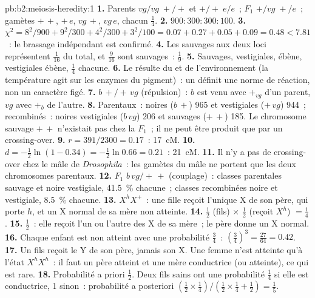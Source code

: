 \begin{solution}{pb:b2:meiosis-heredity:1}
\textbf{1.} Parents $vg/vg\;+/+$ et $+/+\;e/e$~; $F_1$ $+/vg\;+/e$~;
gamètes $+\,+$, $+\,e$, $vg\,+$, $vg\,e$, chacun $\tfrac14$.
\textbf{2.} $900 : 300 : 300 : 100$.
\textbf{3.} $\chi^2 = 8^2/900 + 9^2/300 + 4^2/300 + 3^2/100 = 0.07 +
0.27 + 0.05 + 0.09 = 0.48 < 7.81$~: le brassage indépendant est
confirmé.
\textbf{4.} Les  sauvages aux deux loci représentent
$\tfrac{1}{16}$ du total, et $\tfrac{9}{16}$ sont sauvages~: $\tfrac19$.
\textbf{5.} Sauvages, vestigiales, ébène, vestigiales ébène, $\tfrac14$
chacune.
\textbf{6.} Le  résulte du  et de l'environnement (la
température agit sur les enzymes du pigment)~: un  définit une
norme de réaction, non un caractère figé.
\textbf{7.} $b\,+/+\,vg$ (répulsion)~: $b$ est venu avec $+_{vg}$ d'un
parent, $vg$ avec $+_b$ de l'autre.
\textbf{8.} Parentaux~: noires ($b\,+$) 965 et vestigiales ($+\,vg$)
944~; recombinés~: noires vestigiales ($b\,vg$) 206 et sauvages
($+\,+$) 185. Le chromosome sauvage $+\,+$ n'existait pas chez la
$F_1$~; il ne peut être produit que par un crossing-over.
\textbf{9.} $r = 391/2300 = 0.17$~: \qty{17}{cM}.
\textbf{10.} $d = -\tfrac12\ln(1 - 0.34) = -\tfrac12\ln 0.66 = 0.21$~:
\qty{21}{cM}.
\textbf{11.} Il n'y a pas de crossing-over chez le mâle de
\emph{Drosophila}~: les gamètes du mâle ne portent que les deux
chromosomes parentaux.
\textbf{12.} $F_1$ $b\,vg/+\,+$ (couplage)~: classes parentales sauvage
et noire vestigiale, \qty{41.5}{\%} chacune~; classes recombinées noire
et vestigiale, \qty{8.5}{\%} chacune.
\textbf{13.} $X^hX^+$~: une fille reçoit l'unique X de son père, qui
porte $h$, et un X normal de sa mère non atteinte.
\textbf{14.} $\tfrac12$ (fils) $\times$ $\tfrac12$ (reçoit $X^h$) $=
\tfrac14$.
\textbf{15.} $\tfrac12$~: elle reçoit l'un ou l'autre des X de sa
mère~; le père donne un X normal.
\textbf{16.} Chaque enfant est non atteint avec une probabilité
$\tfrac34$~: $(\tfrac34)^3 = \tfrac{27}{64} = 0.42$.
\textbf{17.} Un fils reçoit le Y de son père, jamais son X. Une femme
n'est atteinte qu'à l'état $X^hX^h$~: il faut un père atteint et une
mère conductrice (ou atteinte), ce qui est rare.
\textbf{18.} Probabilité a priori $\tfrac12$. Deux fils sains ont une
probabilité $\tfrac14$ si elle est conductrice, 1 sinon~: probabilité
a posteriori $(\tfrac12\times
\tfrac14)/(\tfrac12\times\tfrac14 + \tfrac12) = \tfrac15$.

\end{solution}
